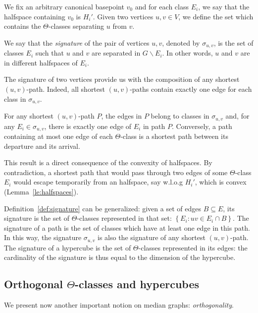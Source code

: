 \documentclass[a4paper,UKenglish,numberwithinsect,cleveref, autoref]{lipics-v2021}
\newcommand{\set}[1]{\left\{ #1 \right\}}
\begin{document}
We fix an arbitrary canonical basepoint $v_0$ and for each class $E_i$, we say that the halfspace containing $v_0$ is $H_i'$.
Given two vertices $u,v \in V$, we define the set which contains the $\Theta$-classes separating $u$ from $v$.

\begin{definition}
We say that the {\em signature} of the pair of vertices $u,v$, denoted by $\sigma_{u,v}$, is the set of classes $E_i$ such that $u$ and $v$ are separated in $G\backslash E_i$. In other words, $u$ and $v$ are in different halfspaces of $E_i$.
\label{def:signature}
\end{definition}

The signature of two vertices provide us with the composition of any shortest $(u,v)$-path. Indeed, all shortest $(u,v)$-paths contain exactly one edge for each class in $\sigma_{u,v}$.

\begin{lemma}
For any shortest $(u,v)$-path $P$, the edges in $P$ belong to classes in $\sigma_{u,v}$ and, for any $E_i \in \sigma_{u,v}$, there is exactly one edge of $E_i$ in path $P$. Conversely, a path containing at most one edge of each $\Theta$-class is a shortest path between its departure and its arrival.
\label{le:signature}
\end{lemma}

This result is a direct consequence of the convexity of halfspaces. By contradiction, a shortest path that would pass through two edges of some $\Theta$-class $E_i$ would escape temporarily from an halfspace, say w.l.o.g $H_i'$,  which is convex (Lemma~\ref{le:halfspaces}).

Definition~\ref{def:signature} can be generalized: given a set of edges $B\subseteq E$, its signature is the set of $\Theta$-classes represented in that set: $\set{E_i : uv \in E_i \cap B}$. The signature of a path is the set of classes which have at least one edge in this path. In this way, the signature $\sigma_{u,v}$ is also the signature of any shortest $(u,v)$-path. The signature of a hypercube is the set of $\Theta$-classes represented in its edges: the cardinality of the signature is thus equal to the dimension of the hypercube.

\subsection{Orthogonal $\Theta$-classes and hypercubes}

We present now another important notion on median graphs: \textit{orthogonality}.
\end{document}
